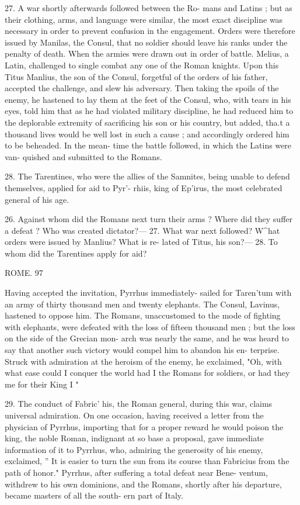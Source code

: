 \documentclass[openany,a4paper]{memoir}
\begin{document}
27. A war shortly afterwards followed between the Ro- 
mans and Latins ; but as their clothing, arms, and language 
were similar, the most exact discipline was necessary in 
order to prevent confusion in the engagement. Orders were 
therefore issued by Manilas, the Consul, that no soldier 
should leave his ranks under the penalty of death. When 
the armies were drawn out in order of battle. Melius, a 
Latin, challenged to single combat any one of the Roman 
knights. Upon this Titus Manlius, the son of the Consul, 
forgetful of the orders of his father, accepted the challenge, 
and slew his adversary. Then taking the spoils of the 
enemy, he hastened to lay them at the feet of the Consul, 
who, with tears in his eyes, told him that as he had violated 
military discipline, he had reduced him to the deplorable 
extremity of sacrificing his son or his country, but added, 
tha.t a thousand lives would be well lost in such a cause ; 
and accordingly ordered him to be beheaded. In the mean- 
time the battle followed, in which the Latins were van- 
quished and submitted to the Romans. 

28. The Tarentines, who were the allies of the Samnites, 
being unable to defend themselves, applied for aid to Pyr'- 
rhiis, king of Ep'irus, the most celebrated general of his 
age. 

26. Against whom did the Romans next turn their arms ? Where 
did they suffer a defeat ? Who was created dictator?— 27. What war 
next followed? W^hat orders were issued by Manlius? What is re- 
lated of Titus, his son?— 28. To whom did the Tarentines apply for 
aid? 



ROME. 97 

Having accepted the invitation, Pyrrhus immediately- 
sailed for Taren'tum with an army of thirty thousand men 
and twenty elephants. The Consul, Lavinus, hastened to 
oppose him. The Romans, unaccustomed to the mode of 
fighting with elephants, were defeated with the loss of fifteen 
thousand men ; but the loss on the side of the Grecian mon- 
arch was nearly the same, and he was heard to say that 
another such victory would compel him to abandon his en- 
terprise. Struck with admiration at the heroism of the 
enemy, he exclaimed, "Oh, with what ease could I conquer 
the world had I the Romans for soldiers, or had they me for 
their King I " 

29. The conduct of Fabric' his, the Roman general, during 
this war, claims universal admiration. On one occasion, 
having received a letter from the physician of Pyrrhus, 
importing that for a proper reward he would poison the 
king, the noble Roman, indignant at so base a proposal, 
gave immediate information of it to Pyrrhus, who, admiring 
the generosity of his enemy, exclaimed, '' It is easier to turn 
the sun from its course than Fabricius from the path of 
honor." Pyrrhus, after suffering a total defeat near Bene- 
ventum, withdrew to his own dominions, and the Romans, 
shortly after his departure, became masters of all the south- 
ern part of Italy. 
\end{document}
